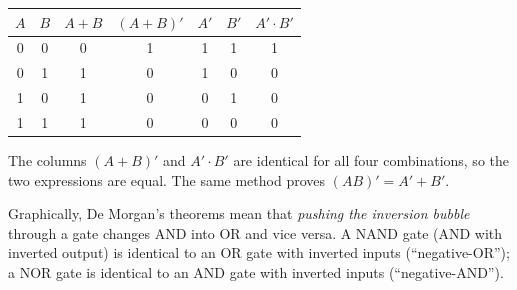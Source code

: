 \documentclass[11pt]{article}
\begin{document}
\begin{exemplebox}[Proof of $(A+B)' = A'\cdot B'$ by perfect induction]
\begin{center}
\begin{tabular}{|cc|c|c|c|c|c|}
\hline
\rowcolor{popblueL} $A$ & $B$ & $A+B$ & $(A+B)'$ & $A'$ & $B'$ & $A'\cdot B'$ \\
\hline
0 & 0 & 0 & 1 & 1 & 1 & 1 \\
\hline
0 & 1 & 1 & 0 & 1 & 0 & 0 \\
\hline
1 & 0 & 1 & 0 & 0 & 1 & 0 \\
\hline
1 & 1 & 1 & 0 & 0 & 0 & 0 \\
\hline
\end{tabular}
\end{center}
The columns $(A+B)'$ and $A'\cdot B'$ are identical for all four combinations, so the two expressions are equal. The same method proves $(AB)' = A'+B'$.
\end{exemplebox}

Graphically, De Morgan's theorems mean that \emph{pushing the inversion bubble} through a gate changes AND into OR and vice versa. A NAND gate (AND with inverted output) is identical to an OR gate with inverted inputs (``negative-OR''); a NOR gate is identical to an AND gate with inverted inputs (``negative-AND'').
\end{document}
